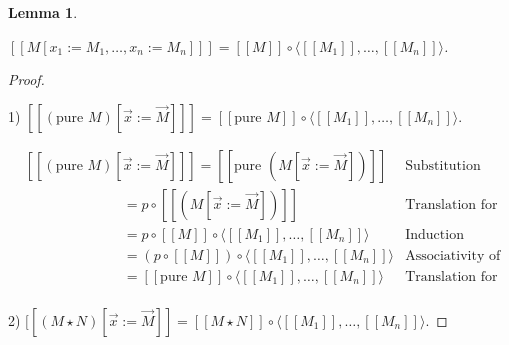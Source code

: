 \documentclass[a4paper]{article}
\newtheorem{lemma}{Lemma}
\begin{document}
\begin{lemma}
$ $

$[\![M [x_1 := M_1,\dots, x_n := M_n]]\!] = [\![M]\!] \circ \langle [\![M_1]\!], \dots, [\![M_n]\!] \rangle$.

\end{lemma}

\begin{proof}

$ $

1) $[\![(\text{pure } M) [ \vec{x} := \vec{M}]]\!] = [\![\text{pure } M]\!] \circ \langle [\![M_1]\!], \dots,
[\![M_n]\!] \rangle$.

\vspace{\baselineskip}

$\begin{array}{lll}
& [\![(\text{pure } M) [ \vec{x} := \vec{M}]]\!] = [\![\text{pure } (M [ \vec{x} := \vec{M}])]\!] &
\text{Substitution definition} \\
& \quad\quad\quad\quad\quad\quad\quad = p \circ [\![(M [ \vec{x} := \vec{M}])]\!]&
\text{Translation for pure}\\
& \quad\quad\quad\quad\quad\quad\quad = p \circ [\![M]\!] \circ \langle [\![M_1]\!], \dots,
[\![M_n]\!] \rangle & \text{Induction hypothesis} \\
& \quad\quad\quad\quad\quad\quad\quad = (p \circ [\![M]\!]) \circ \langle [\![M_1]\!], \dots,
[\![M_n]\!] \rangle & \text{Associativity of composition}\\
& \quad\quad\quad\quad\quad\quad\quad = [\![\text{pure } M]\!] \circ \langle [\![M_1]\!], \dots,
[\![M_n]\!] \rangle& \text{Translation for pure}\\
\end{array}$

\vspace{\baselineskip}

2) $[\![(M \star N) [ \vec{x} := \vec{M}] \!] = [\![M \star N]\!] \circ \langle [\![M_1]\!], \dots,
[\![M_n]\!] \rangle$.

\vspace{\baselineskip}


\end{proof}
\end{document}
